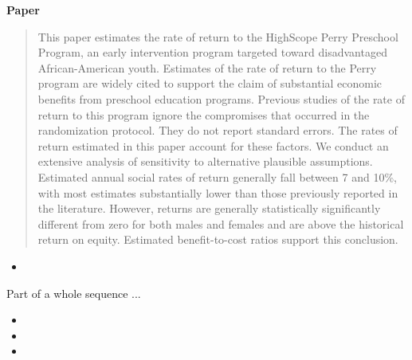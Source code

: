 \begin{frame}\begin{center}
{\LARGE\textbf{Paper}}
\end{center}\end{frame}
\begin{frame}
\begin{quote}\small
This paper estimates the rate of return to the HighScope Perry Preschool Program, an early intervention
program targeted toward disadvantaged African-American youth. Estimates of the rate of return to the Perry
program are widely cited to support the claim of substantial economic benefits from preschool education
programs. Previous studies of the rate of return to this program ignore the compromises that occurred in the
randomization protocol. They do not report standard errors. The rates of return estimated in this paper
account for these factors. We conduct an extensive analysis of sensitivity to alternative plausible
assumptions. Estimated annual social rates of return generally fall between 7 and 10\%, with most estimates
substantially lower than those previously reported in the literature. However, returns are generally
statistically significantly different from zero for both males and females and are above the historical return
on equity. Estimated benefit-to-cost ratios support this conclusion.
\end{quote}
\end{frame}
\begin{frame}
\begin{itemize}
\item{}
\end{itemize}
Part of a whole sequence ...

{\scriptsize\begin{itemize}
\item{}
\item{}
\item{}
\end{itemize}}
\end{frame}

